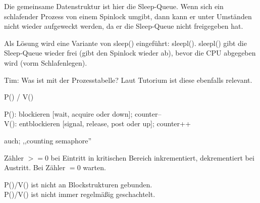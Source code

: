 \begin{answer}
Die gemeinsame Datenstruktur ist hier die Sleep-Queue. Wenn sich ein schlafender Prozess von einem Spinlock umgibt, dann kann er unter Umständen nicht wieder aufgeweckt werden, da er die Sleep-Queue nicht freigegeben hat.

Als Lösung wird eine Variante von sleep() eingeführt: sleepl().
sleepl() gibt die Sleep-Queue wieder frei (gibt den Spinlock wieder ab), bevor die CPU abgegeben wird (vorm Schlafenlegen).

Tim: Was ist mit der Prozesstabelle? Laut Tutorium ist diese ebenfalls relevant.
\end{answer}

\begin{answer}
P() / V()

P(): blockieren [wait, acquire oder down]; counter-- \\
V(): entblockieren [signal, release, post oder up]; counter++

auch; ,,counting semaphore''

Zähler $>= 0$ bei Eintritt in kritischen Bereich inkrementiert, dekrementiert bei Austritt. Bei Zähler $= 0$ warten.

P()/V() ist nicht an Blockstrukturen gebunden. \\
P()/V() ist nicht immer regelmäßig geschachtelt.
\end{answer}

